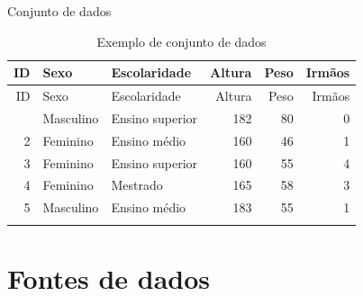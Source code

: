 \documentclass[
  ignorenonframetext,
  serif,
  professionalfont,
  usenames,
  dvipsnames,
  aspectratio = 169]{beamer}
\begin{document}
\begin{frame}{Conjunto de dados}
\label{conjunto-de-dados-2}
\begin{longtable}[]{@{}rllrrr@{}}
\caption{Exemplo de conjunto de dados}\tabularnewline
\toprule\noalign{}
ID & Sexo & Escolaridade & Altura & Peso & Irmãos \\
\midrule\noalign{}
\endfirsthead
\toprule\noalign{}
ID & Sexo & Escolaridade & Altura & Peso & Irmãos \\
\midrule\noalign{}
\endhead
1 & Masculino & Ensino superior & 182 & 80 & 0 \\
2 & Feminino & Ensino médio & 160 & 46 & 1 \\
3 & Feminino & Ensino superior & 160 & 55 & 4 \\
4 & Feminino & Mestrado & 165 & 58 & 3 \\
5 & Masculino & Ensino médio & 183 & 55 & 1 \\
\bottomrule\noalign{}
\end{longtable}
\end{frame}

\section{Fontes de dados}\label{fontes-de-dados}
\end{document}

